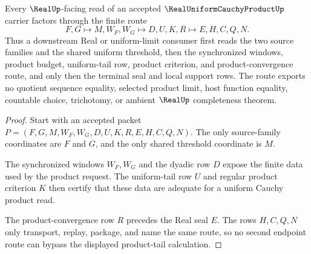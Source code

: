 \begin{theorem}
\label{thm:real-uniform-cauchy-product-seal-factorization}
Every $\RealUp$-facing read of an accepted $\RealUniformCauchyProductUp$ carrier factors through the finite route
$$
F,G \longmapsto M,W_F,W_G \longmapsto D,U,K,R \longmapsto E,H,C,Q,N .
$$
Thus a downstream Real or uniform-limit consumer first reads the two source families and the shared uniform threshold, then the synchronized windows, product budget, uniform-tail row, product criterion, and product-convergence route, and only then the terminal seal and local support rows. The route exports no quotient sequence equality, selected product limit, host function equality, countable choice, trichotomy, or ambient $\RealUp$ completeness theorem.
\end{theorem}
\begin{proof}
Start with an accepted packet $P=(F,G,M,W_F,W_G,D,U,K,R,E,H,C,Q,N)$. The only source-family coordinates are $F$ and $G$, and the only shared threshold coordinate is $M$.

The synchronized windows $W_F,W_G$ and the dyadic row $D$ expose the finite data used by the product request. The uniform-tail row $U$ and regular product criterion $K$ then certify that these data are adequate for a uniform Cauchy product read.

The product-convergence row $R$ precedes the Real seal $E$. The rows $H,C,Q,N$ only transport, replay, package, and name the same route, so no second endpoint route can bypass the displayed product-tail calculation.
\end{proof}



